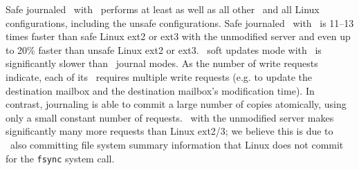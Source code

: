Safe journaled \Kudos\ with \patchgroups\ performs at least as well as
all other \Kudos\ and all Linux configurations, including the unsafe
configurations. Safe journaled \Kudos\ with \patchgroups\ is 11--13
times faster than safe Linux ext2 or ext3 with the unmodified server
and even up to 20\% faster than unsafe Linux ext2 or ext3.
%
\Kudos\ soft updates mode with \patchgroups\ is significantly slower
than \Kudos\ journal modes. As the number of write requests indicate,
each of its \patchgroups\ requires multiple write requests (e.g. to
update the destination mailbox and the destination mailbox's
modification time). In contrast, journaling is able to commit a large
number of copies atomically, using only a small constant number of
requests.
%
\Kudos\ with the unmodified server makes significantly many more
requests than Linux ext2/3; we believe this is due to \Kudos\ also
committing file system summary information that Linux does not commit
for the \texttt{fsync} system call.
%

